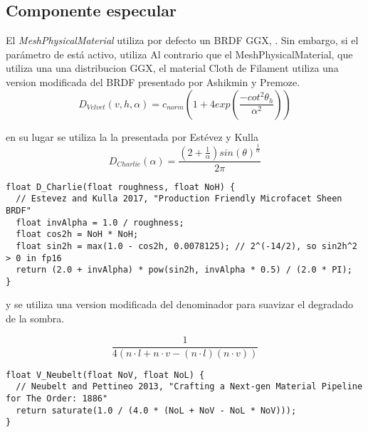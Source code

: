   \subsection{Componente especular}

  El \textit{MeshPhysicalMaterial} utiliza por defecto un BRDF GGX, \autocite{ggx}. Sin embargo, si el par\'ametro de 
  est\'a activo, utiliza 
  Al contrario que el MeshPhysicalMaterial, que utiliza una una distribucion GGX, el material
  Cloth de Filament utiliza una  version modificada del BRDF presentado por Ashikmin y Premoze.
  \autocite{ashikhmin}\\

  \begin{equation}
  D_{Velvet}(v, h, \alpha) = c_{norm} (
    1 + 4exp \left(\frac{-cot^2\theta_h}{\alpha^2}\right)
  )
  \end{equation}
  \singlespacing

  \hspace{-1.5em}en su lugar se utiliza la la presentada por Est\'evez y Kulla \autocite{sheen}\\

  \begin{equation}
    D_{Charlie}(\alpha) = \frac
      {(2 + \frac{1}{\alpha})sin(\theta)^\frac{1}{\alpha}}
      {2\pi}
  \end{equation}
  \singlespacing

  \begin{lstlisting}[caption=Cambios sobre la clase WebGLPrograms de ThreeJs]
float D_Charlie(float roughness, float NoH) {
  // Estevez and Kulla 2017, "Production Friendly Microfacet Sheen BRDF"
  float invAlpha = 1.0 / roughness;
  float cos2h = NoH * NoH;
  float sin2h = max(1.0 - cos2h, 0.0078125); // 2^(-14/2), so sin2h^2 > 0 in fp16
  return (2.0 + invAlpha) * pow(sin2h, invAlpha * 0.5) / (2.0 * PI);
}
  \end{lstlisting}
  \singlespacing

  \hspace{-1.5em}y se utiliza una version modificada del denominador para suavizar el degradado de la sombra.

  \begin{equation}
  \frac{1}{4(n\cdot{l} + n\cdot{v} - (n\cdot{l})(n\cdot{v}) )}
  \end{equation}
  \singlespacing


  \begin{lstlisting}[caption=Cambios sobre la clase WebGLPrograms de ThreeJs]
float V_Neubelt(float NoV, float NoL) {
  // Neubelt and Pettineo 2013, "Crafting a Next-gen Material Pipeline for The Order: 1886"
  return saturate(1.0 / (4.0 * (NoL + NoV - NoL * NoV)));
}
  \end{lstlisting}

